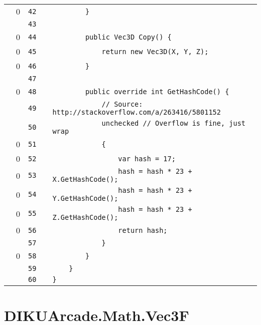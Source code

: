 \documentclass[a4paper,landscape,10pt]{article}
\begin{document}
\begin{longtable}[l]{lrrll}
\cellcolor{red} & 0 & \verb~42~ & & \verb~        }~\\
\cellcolor{gray} &  & \verb~43~ & & \verb~~\\
\cellcolor{red} & 0 & \verb~44~ & & \verb~        public Vec3D Copy() {~\\
\cellcolor{red} & 0 & \verb~45~ & & \verb~            return new Vec3D(X, Y, Z);~\\
\cellcolor{red} & 0 & \verb~46~ & & \verb~        }~\\
\cellcolor{gray} &  & \verb~47~ & & \verb~~\\
\cellcolor{red} & 0 & \verb~48~ & & \verb~        public override int GetHashCode() {~\\
\cellcolor{gray} &  & \verb~49~ & & \verb~            // Source: http://stackoverflow.com/a/263416/5801152~\\
\cellcolor{gray} &  & \verb~50~ & & \verb~            unchecked // Overflow is fine, just wrap~\\
\cellcolor{red} & 0 & \verb~51~ & & \verb~            {~\\
\cellcolor{red} & 0 & \verb~52~ & & \verb~                var hash = 17;~\\
\cellcolor{red} & 0 & \verb~53~ & & \verb~                hash = hash * 23 + X.GetHashCode();~\\
\cellcolor{red} & 0 & \verb~54~ & & \verb~                hash = hash * 23 + Y.GetHashCode();~\\
\cellcolor{red} & 0 & \verb~55~ & & \verb~                hash = hash * 23 + Z.GetHashCode();~\\
\cellcolor{red} & 0 & \verb~56~ & & \verb~                return hash;~\\
\cellcolor{gray} &  & \verb~57~ & & \verb~            }~\\
\cellcolor{red} & 0 & \verb~58~ & & \verb~        }~\\
\cellcolor{gray} &  & \verb~59~ & & \verb~    }~\\
\cellcolor{gray} &  & \verb~60~ & & \verb~}~\\
\end{longtable}
\newpage
\section{DIKUArcade.Math.Vec3F}
\end{document}
